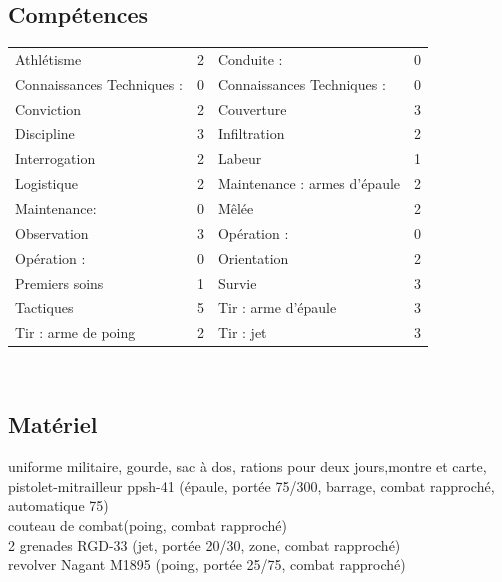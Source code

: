 \documentclass{report}
\begin{document}
\subsection*{Compétences}
\begin{tabular}{p{}| r || p{}| r|}
Athlétisme &2 &Conduite : & 0\\
Connaissances Techniques : & 0 &Connaissances Techniques : & 0\\
Conviction & 2 &Couverture& 3\\
Discipline & 3 &Infiltration& 2\\
Interrogation & 2& Labeur& 1\\
Logistique & 2& Maintenance : armes d'épaule & 2 \\
Maintenance: & 0 & Mêlée& 2\\
Observation & 3 & Opération : & 0\\
Opération : & 0 & Orientation& 2\\
Premiers soins & 1 & Survie& 3\\
Tactiques & 5 & Tir : arme d'épaule& 3\\
Tir : arme de poing & 2& Tir : jet & 3\\
\end{tabular}\\
\noindent\makebox[\linewidth]{\rule{\textwidth}{0.4pt}}
\subsection*{Matériel}
uniforme militaire, gourde, sac à dos, rations pour deux jours,montre et carte,\\
pistolet-mitrailleur ppsh-41 (épaule, portée 75/300, barrage, combat rapproché, automatique 75) \\
couteau de combat(poing, combat rapproché)\\
2 grenades RGD-33 (jet, portée 20/30, zone, combat rapproché)\\
revolver Nagant M1895 (poing, portée 25/75, combat rapproché)\\
\noindent\makebox[\linewidth]{\rule{\textwidth}{0.4pt}}
\end{document}
